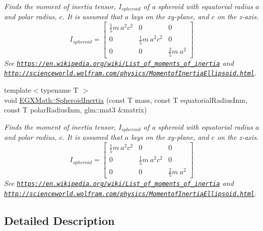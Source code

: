 \begin{DoxyCompactItemize}
\begin{DoxyCompactList}\small\item\em Finds the moment of inertia tensor, $I_{spheroid}$ of a spheroid with equatorial radius $a$ and polar radius, $c$. It is assumed that $a$ lays on the xy-\/plane, and $c$ on the z-\/axis. \[ I_{spheroid}=\begin{bmatrix} \frac{1}{5}m\ a^2c^2 & 0 & 0\\ 0 & \frac{1}{5}m\ a^2c^2 & 0\\ 0 & 0 & \frac{2}{5}m\ a^2 \end{bmatrix} \] See \href{https://en.wikipedia.org/wiki/List_of_moments_of_inertia}{\tt https\+://en.\+wikipedia.\+org/wiki/\+List\+\_\+of\+\_\+moments\+\_\+of\+\_\+inertia} and \href{http://scienceworld.wolfram.com/physics/MomentofInertiaEllipsoid.html}{\tt http\+://scienceworld.\+wolfram.\+com/physics/\+Momentof\+Inertia\+Ellipsoid.\+html}. \end{DoxyCompactList}\item 
{\footnotesize template$<$typename T $>$ }\\void \mbox{\hyperlink{group___e_g_x_math-_geometry-3_d-_spheroid-_inertia_ga0d621d59c21aeddf2ed5e9050aa2eeb8}{E\+G\+X\+Math\+::\+Spheroid\+Inertia}} (const T mass, const T equatorial\+Radius\+Inm, const T polar\+Radius\+Inm, glm\+::mat3 \&matrix)
\begin{DoxyCompactList}\small\item\em Finds the moment of inertia tensor, $I_{spheroid}$ of a spheroid with equatorial radius $a$ and polar radius, $c$. It is assumed that $a$ lays on the xy-\/plane, and $c$ on the z-\/axis. \[ I_{spheroid}=\begin{bmatrix} \frac{1}{5}m\ a^2c^2 & 0 & 0\\ 0 & \frac{1}{5}m\ a^2c^2 & 0\\ 0 & 0 & \frac{2}{5}m\ a^2 \end{bmatrix} \] See \href{https://en.wikipedia.org/wiki/List_of_moments_of_inertia}{\tt https\+://en.\+wikipedia.\+org/wiki/\+List\+\_\+of\+\_\+moments\+\_\+of\+\_\+inertia} and \href{http://scienceworld.wolfram.com/physics/MomentofInertiaEllipsoid.html}{\tt http\+://scienceworld.\+wolfram.\+com/physics/\+Momentof\+Inertia\+Ellipsoid.\+html}. \end{DoxyCompactList}\end{DoxyCompactItemize}


\subsection{Detailed Description}


